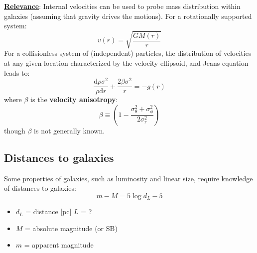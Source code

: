 \documentclass{article}
\newcommand{\mynotes}[1]{\textcolor{cadmiumorange}{#1}}
\begin{document}
\underline{\textbf{Relevance}}:
Internal velocities can be used to probe mass distribution within
galaxies (assuming that gravity drives the motions).
For a rotationally supported system:
\[
    v(r) = \sqrt{\frac{GM(r)}{r}}
    \]
For a collisionless system of \mynotes{(independent)} particles,
the distribution of velocities at
any given location characterized by the velocity ellipsoid, and
Jeans equation leads to:
\[
    \frac{\mathrm{d}\rho\sigma^{2}}{\rho{\mathrm{d}r}} +
    \frac{2\beta\sigma^{2}}{r} = -g(r)
    \]
where $\beta$ is the \textbf{velocity anisotropy}:
\[
    \beta \equiv \left(1-
    \frac{\sigma_{\theta}^{2}+\sigma_{\phi}^{2}}{2\sigma_{r}^{2}}\right)
    \]
though $\beta$ is not generally known.

\subsection{Distances to galaxies}
Some properties of galaxies, such as luminosity and linear size,
require knowledge of distances to galaxies:
\[
    m-M = 5\log{d_{L}}-5
\]
\begin{itemize}
    \item $d_{L}$ = distance [pc] \mynotes{$L$ = ?}
    \item $M$ = absolute magnitude (or SB)
    \item $m$ = apparent magnitude
\end{itemize}
\end{document}
